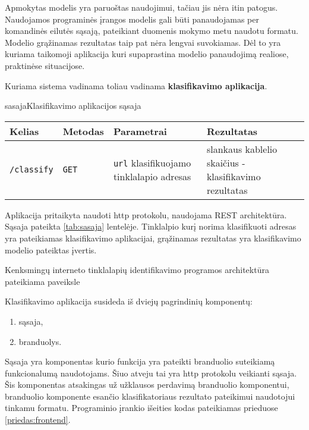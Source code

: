 
Apmokytas modelis yra paruoštas naudojimui, tačiau jis nėra itin patogus. Naudojamos programinės įrangos modelis gali
būti panaudojamas per komandinės eilutės sąsają, pateikiant duomenis mokymo metu naudotu formatu. Modelio grąžinamas
rezultatas taip pat nėra lengvai suvokiamas. Dėl to yra kuriama taikomoji aplikacija kuri supaprastina modelio
panaudojimą realiose, praktinėse situacijose.

Kuriama sistema vadinama toliau vadinama \textbf{klasifikavimo aplikacija}.

\begin{ktutable}{sasaja}{Klasifikavimo aplikacijos sąsaja}
    \begin{tabular}{|l|l|p{5cm}|p{5cm}|}
    \hline
        Kelias & Metodas & Parametrai & Rezultatas \\ \hline
        \texttt{/classify} & \texttt{GET} & \texttt{url} klasifikuojamo tinklalapio adresas & slankaus kablelio skaičius - klasifikavimo rezultatas \\ \hline
    \end{tabular}
\end{ktutable}

Aplikacija pritaikyta naudoti http protokolu, naudojama REST architektūra. Sąsaja pateikta \vref{tab:sasaja}
lentelėje. Tinklalpio kurį norima klasifikuoti adresas yra pateikiamas klasifikavimo aplikacijai, grąžinamas
rezultatas yra klasifikavimo modelio pateiktas įvertis.

Kenksmingų interneto tinklalapių identifikavimo programos architektūra pateikiama paveiksle 


Klasifikavimo aplikacija susideda iš dviejų pagrindinių komponentų:
\begin{enumerate}
\item sąsaja,
\item branduolys.
\end{enumerate}
Sąsaja yra komponentas kurio funkcija yra pateikti branduolio suteikiamą funkcionalumą naudotojams. Šiuo atveju
tai yra http protokolu veikianti sąsaja. Šis komponentas atsakingas už užklausos perdavimą branduolio komponentui,
branduolio komponente esančio klasifikatoriaus rezultato pateikimui naudotojui tinkamu formatu. Programinio
įrankio išeities kodas pateikiamas prieduose \vref{priedas:frontend}.

